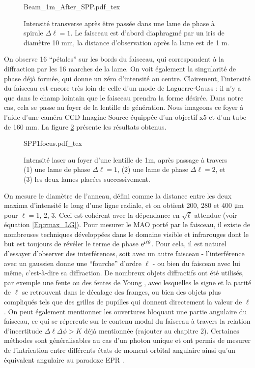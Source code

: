 \begin{figure}[!ht]
\centering
\def\svgwidth{0.4\columnwidth}
{Beam_1m_After_SPP.pdf_tex}
\caption{Intensité transverse après être passée dans une lame de phase à spirale $\Delta\ell = 1$. Le faisceau est d'abord diaphragmé par un iris de diamètre 10 mm, la distance d'observation après la lame est de 1 m.}
\label{Fig:BeamAfterSPP}
\end{figure}

On observe 16 ``pétales'' sur les bords du faisceau, qui correspondent à la diffraction par les 16 marches de la lame. On voit également la singularité de phase déjà formée, qui donne un zéro d'intensité au centre. Clairement, l'intensité du faisceau est encore très loin de celle d'un mode de Laguerre-Gauss : il n'y a que dans le champ lointain que le faisceau prendra la forme désirée. Dans notre cas, cela se passe au foyer de la lentille de génération. Nous imageons ce foyer à l'aide d'une caméra CCD Imagine Source équippée d'un objectif x5 et d'un tube de 160 mm. La figure \ref{Fig:LGFocus} présente les résultats obtenus.\par
\begin{figure}[!ht]
\centering
\def\svgwidth{0.8\columnwidth}
{SPP1focus.pdf_tex}
\caption{Intensité laser au foyer d'une lentille de 1m, après passage à travers (1) une lame de phase $\Delta\ell = 1$, (2) une lame de phase $\Delta\ell = 2$, et (3) les deux lames placées successivement.}
\label{Fig:LGFocus}
\end{figure}
On mesure le diamètre de l'anneau, défini comme la distance entre les deux maxima d'intensité le long d'une ligne radiale, et on obtient 200, 280 et 400 \si{\um} pour $\ell=$1, 2, 3. Ceci est cohérent avec la dépendance en $\sqrt{\ell}$ attendue (voir équation \ref{Eq:rmax_LG}). Pour mesurer le MAO porté par le faisceau, il existe de nombreuses techniques développées dans le domaine visible et infrarouges dont le but est toujours de révéler le terme de phase $\mathrm{e}^{\mathrm{i}\ell\theta}$. Pour cela, il est naturel d'essayer d'observer des interférences, soit avec un autre faisceau - l'interférence avec un gaussien donne une ``fourche'' d'ordre $\ell$  - ou bien du faisceau avec lui même, c'est-à-dire sa diffraction. De nombreux objets diffractifs ont été utilisés, par exemple une fente  ou des fentes de Young , avec lesquelles le signe et la parité de $\ell$ se retrouvent dans le décalage des franges, ou bien des objets plus compliqués tels que des grilles de pupilles  qui donnent directement la valeur de $\ell$. On peut également mentionner les ouvertures bloquant une partie angulaire du faisceau, ce qui se répercute sur le contenu modal du faisceau à travers la relation d'incertitude $\Delta\ell\Delta\phi > K$ déjà mentionnée (\textcolor[rgb]{1,0,0}{rajouter au chapitre 2}). Certaines méthodes sont généralisables au cas d'un photon unique et ont permis de mesurer de l'intrication entre différents états de moment orbital angulaire  ainsi qu'un équivalent angulaire au paradoxe EPR . \par 
